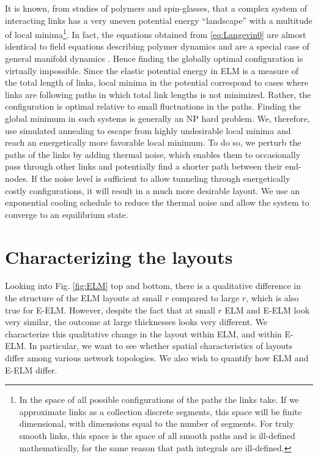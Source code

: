 \documentclass[nofootinbib,preprint,floatfix]{revtex4} %
\begin{document}
It is known, from studies of polymers and spin-glasses, that a complex system of interacting links has a very uneven potential energy ``landscape'' \cite{parisi2002physical} with a multitude of local minima\footnote{In the space of all possible configurations of the paths the links take.
If we approximate links as a collection discrete segments, this space will be finite dimensional, with dimensions equal to the number of segments. 
For truly smooth links, this space is the space of all smooth paths and is ill-defined mathematically, for the same reason that path integrals are ill-defined.}.
In fact, 
the equations obtained from \eqref{eq:Langevin0} are almost identical to field equations describing polymer dynamics and are a special case of general manifold dynamics \cite{mezard1991replica}. 
Hence finding the globally optimal configuration is virtually impossible. 
Since the elastic potential energy in ELM is a measure of the total length of links, local minima in the potential correspond to cases where links are following paths in which total link lengths is not minimized. 
Rather, the configuration is optimal relative to small fluctuations in the paths. 
Finding the global minimum in such systems is generally an NP hard problem.
We, therefore, use simulated annealing \cite{hwang1988simulated} to escape from highly undesirable local minima and reach an energetically more favorable local minimum. 
To do so, we perturb the paths of the links by adding thermal noise, which enables them to occasionally pass through other links and potentially find a shorter path between their end-nodes.
If the noise level is sufficient to allow tunneling through energetically costly configurations, it will result in a much more desirable layout.
We use an exponential cooling schedule to reduce the thermal noise and allow the system to converge to an equilibrium state. 

\section{Characterizing the layouts}
Looking into Fig. \ref{fig:ELM} top and bottom, there is a qualitative difference in the structure of the ELM layouts at small $r$ compared to large $r$, which is also true for E-ELM.
However, despite the fact that at small $r$ ELM and E-ELM look very similar, the outcome at large thicknesses looks very different. 
We characterize this qualitative change in the layout within ELM, and within E-ELM. 
In particular, we want to see whether spatial characteristics of layouts differ  among various network topologies. We also wish to quantify how ELM and E-ELM differ. 
\end{document}

